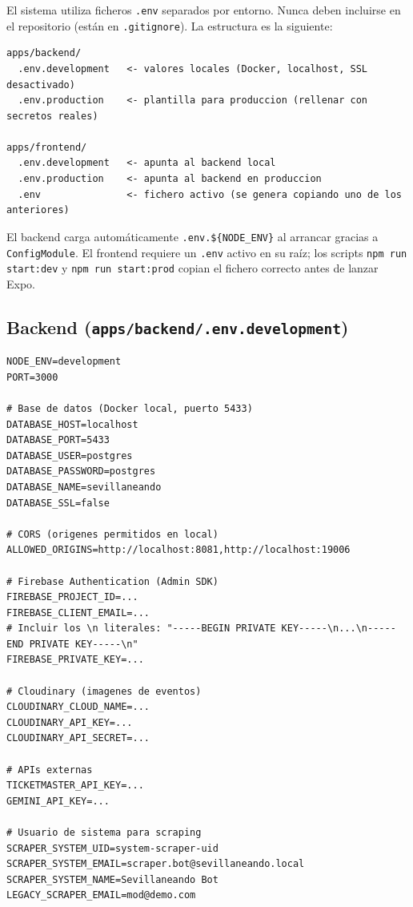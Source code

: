 El sistema utiliza ficheros \texttt{.env} separados por entorno. Nunca deben incluirse en el repositorio (están en \texttt{.gitignore}). La estructura es la siguiente:

\begin{verbatim}
apps/backend/
  .env.development   <- valores locales (Docker, localhost, SSL desactivado)
  .env.production    <- plantilla para produccion (rellenar con secretos reales)

apps/frontend/
  .env.development   <- apunta al backend local
  .env.production    <- apunta al backend en produccion
  .env               <- fichero activo (se genera copiando uno de los anteriores)
\end{verbatim}

El backend carga automáticamente \texttt{.env.\$\{NODE\_ENV\}} al arrancar gracias a \texttt{ConfigModule}. El frontend requiere un \texttt{.env} activo en su raíz; los scripts \texttt{npm run start:dev} y \texttt{npm run start:prod} copian el fichero correcto antes de lanzar Expo.

\subsection{Backend (\texttt{apps/backend/.env.development})}

\begin{lstlisting}
NODE_ENV=development
PORT=3000

# Base de datos (Docker local, puerto 5433)
DATABASE_HOST=localhost
DATABASE_PORT=5433
DATABASE_USER=postgres
DATABASE_PASSWORD=postgres
DATABASE_NAME=sevillaneando
DATABASE_SSL=false

# CORS (origenes permitidos en local)
ALLOWED_ORIGINS=http://localhost:8081,http://localhost:19006

# Firebase Authentication (Admin SDK)
FIREBASE_PROJECT_ID=...
FIREBASE_CLIENT_EMAIL=...
# Incluir los \n literales: "-----BEGIN PRIVATE KEY-----\n...\n-----END PRIVATE KEY-----\n"
FIREBASE_PRIVATE_KEY=...

# Cloudinary (imagenes de eventos)
CLOUDINARY_CLOUD_NAME=...
CLOUDINARY_API_KEY=...
CLOUDINARY_API_SECRET=...

# APIs externas
TICKETMASTER_API_KEY=...
GEMINI_API_KEY=...

# Usuario de sistema para scraping
SCRAPER_SYSTEM_UID=system-scraper-uid
SCRAPER_SYSTEM_EMAIL=scraper.bot@sevillaneando.local
SCRAPER_SYSTEM_NAME=Sevillaneando Bot
LEGACY_SCRAPER_EMAIL=mod@demo.com
\end{lstlisting}

